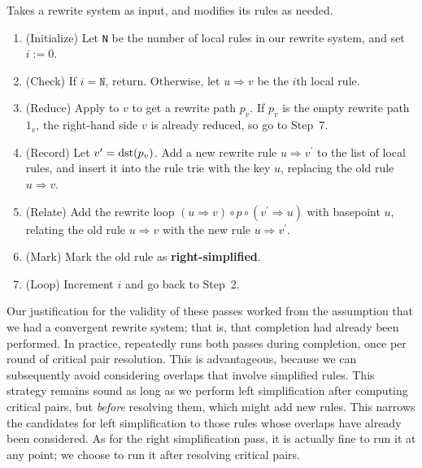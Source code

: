 \documentclass[../generics]{subfiles}
\begin{document}
\begin{algorithm}\label{right simplification}
Takes a rewrite system as input, and modifies its rules as needed.
\begin{enumerate}
\item (Initialize) Let \texttt{N} be the number of local rules in our rewrite system, and set $i:=0$.
\item (Check) If $i=\texttt{N}$, return. Otherwise, let $u\Rightarrow v$ be the $i$th local rule.
\item (Reduce) Apply  to $v$ to get a rewrite path $p_v$. If $p_v$ is the empty rewrite path $1_{v}$, the right-hand side $v$ is already reduced, so go to Step~7.
\item (Record) Let $v^\prime=\operatorname{dst}(p_v)$. Add a new rewrite rule $u\Rightarrow v^\prime$ to the list of local rules, and insert it into the rule trie with the key $u$, replacing the old rule $u\Rightarrow v$.
\item (Relate) Add the rewrite loop $(u\Rightarrow v)\circ p\circ(v^\prime\Rightarrow u)$ with basepoint $u$, relating the old rule $u\Rightarrow v$ with the new rule $u\Rightarrow v^\prime$.
\item (Mark) Mark the old rule as \textbf{right-simplified}.
\item (Loop) Increment $i$ and go back to Step~2.
\end{enumerate}
\end{algorithm}

Our justification for the validity of these passes worked from the assumption that we had a convergent rewrite system; that is, that completion had already been performed. In practice,  repeatedly runs both passes during completion, once per round of critical pair resolution. This is advantageous, because we can subsequently avoid considering overlaps that involve simplified rules. This strategy remains sound as long as we perform left simplification after computing critical pairs, but \emph{before} resolving them, which might add new rules. This narrows the candidates for left simplification to those rules whose overlaps have already been considered. As for the right simplification pass, it is actually fine to run it at any point; we choose to run it after resolving critical pairs.
\end{document}
